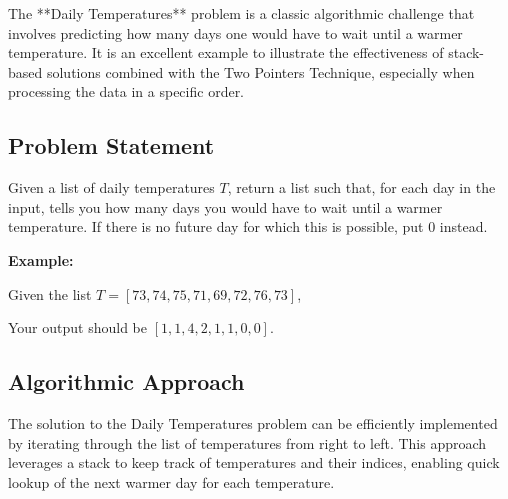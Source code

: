 
\label{problem:DailyTemperatures}

The **Daily Temperatures** problem is a classic algorithmic challenge that involves predicting how many days one would have to wait until a warmer temperature. It is an excellent example to illustrate the effectiveness of stack-based solutions combined with the Two Pointers Technique, especially when processing the data in a specific order.

\subsection*{Problem Statement}
Given a list of daily temperatures \( T \), return a list such that, for each day in the input, tells you how many days you would have to wait until a warmer temperature. If there is no future day for which this is possible, put 0 instead.

\textbf{Example:}

Given the list \( T = [73, 74, 75, 71, 69, 72, 76, 73] \),

Your output should be \( [1, 1, 4, 2, 1, 1, 0, 0] \).

\subsection*{Algorithmic Approach}
The solution to the Daily Temperatures problem can be efficiently implemented by iterating through the list of temperatures from right to left. This approach leverages a stack to keep track of temperatures and their indices, enabling quick lookup of the next warmer day for each temperature.


